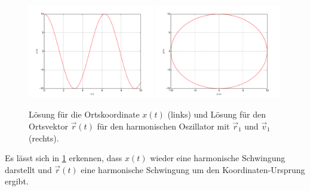 \begin{figure}
	\centering
	\includegraphics[width = 0.49\textwidth]{../Plots/Plot_2_A_3}
		\includegraphics[width = 0.49\textwidth]{../Plots/Plot_2_A_2}
		\caption{Lösung für die Ortskoordinate $x(t)$ (links) und Lösung für den Ortsvektor $\vec{r}(t)$ für den harmonischen Oszillator mit $\vec{r}_1$ und $\vec{v}_1$ (rechts).\label{fig:Geschw}}
\end{figure}
Es lässt sich in \cref{fig:Geschw} erkennen, dass $x(t)$ wieder eine harmonische Schwingung darstellt und $\vec{r}(t)$ eine harmonische Schwingung um den Koordinaten-Ursprung ergibt.
\newpage
